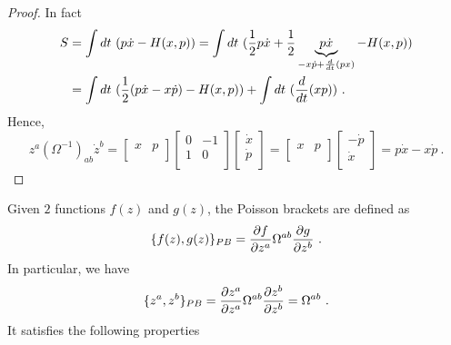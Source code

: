     \begin{proof}
        In fact 
        \begin{equation*}
        \begin{aligned}
            S & = \int dt ~ (p \dot x - H(x, p)) = \int dt ~ (\frac{1}{2}p \dot x + \frac{1}{2} \underbrace{p \dot x}_{- x \dot p + \frac{d}{dt} (p x)} - H(x, p)) \\ & = \int dt ~ (\frac{1}{2} (p \dot x - x \dot p) - H(x, p)) + \int dt ~ (\frac{d}{dt} (xp)) ~.
        \end{aligned}
        \end{equation*}
        Hence,
        \begin{equation*}
            z^a (\Omega^{-1})_{ab} \dot z^b = \begin{bmatrix}
                x & p \\
            \end{bmatrix} \begin{bmatrix}
                0 & -1 \\ 1 & 0 \\
            \end{bmatrix} \begin{bmatrix}
                \dot x \\ \dot p \\
            \end{bmatrix} = \begin{bmatrix}
                x & p \\
            \end{bmatrix} \begin{bmatrix}
                - \dot p \\ \dot x \\
            \end{bmatrix} = p \dot x - x \dot p ~.
        \end{equation*}
    \end{proof}
    Given $2$ functions $f(z)$ and $g(z)$, the Poisson brackets are defined as 
    \begin{equation*}
        \{f(z), g(z)\}_{PB} = \frac{\partial f}{\partial z^a} \Omega^{ab} \frac{\partial g}{\partial z^b} ~.
    \end{equation*}
    In particular, we have 
    \begin{equation*}
        \{z^a, z^b\}_{PB} = \frac{\partial z^a}{\partial z^a} \Omega^{ab} \frac{\partial z^b}{\partial z^b} =  \Omega^{ab} ~.
    \end{equation*}
    It satisfies the following properties 
